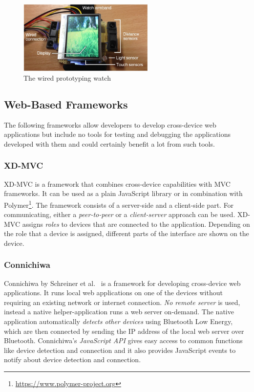 \begin{figure}[H]
  \centering
    \includegraphics[width=0.6\textwidth]{images/relatedwork/watchconnect.png}
	\caption[WatchConnect's wired prototyping watch]{The wired prototyping watch}
	\label{fig:watchconnect}
\end{figure}

\subsection{Web-Based Frameworks}

The following frameworks allow developers to develop cross-device web applications but include no tools for testing and debugging the applications developed with them and could certainly benefit a lot from such tools.

\subsubsection{XD-MVC}

XD-MVC is a framework that combines cross-device capabilities with MVC frameworks. It can be used as a plain JavaScript library or in combination with Polymer\footnote{\url{https://www.polymer-project.org}}. The framework consists of a server-side and a client-side part. For communicating, either a \emph{peer-to-peer} or a \emph{client-server} approach can be used. XD-MVC assigns \emph{roles} to devices that are connected to the application. Depending on the role that a device is assigned, different parts of the interface are shown on the device. 

\subsubsection{Connichiwa}

Connichiwa by Schreiner et al.~\cite{connichiwa2015} is a framework for developing cross-device web applications. It runs local web applications on one of the devices without requiring an existing network or internet connection. \emph{No remote server} is used, instead a native helper-application runs a web server on-demand. The native application automatically \emph{detects other devices} using Bluetooth Low Energy, which are then connected by sending the IP address of the local web server over Bluetooth. Connichiwa's \emph{JavaScript API} gives easy access to common functions like device detection and connection and it also provides JavaScript events to notify about device detection and connection.

